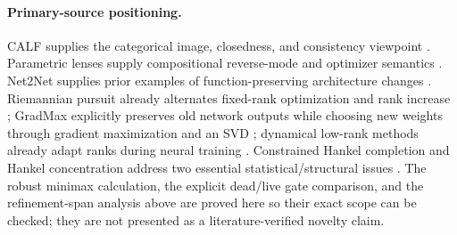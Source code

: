 \documentclass[11pt]{article}
\theoremstyle{definition}
\theoremstyle{remark}
\begin{document}
\paragraph{Primary-source positioning.}
CALF supplies the categorical image, closedness, and consistency viewpoint
\cite{ce:calf2017}. Parametric lenses supply compositional reverse-mode and
optimizer semantics \cite{ce:lenses2024}. Net2Net supplies prior examples
of function-preserving architecture changes \cite{ce:net2net2016}.
Riemannian pursuit already alternates fixed-rank optimization and rank
increase \cite{ce:tan2014}; GradMax explicitly preserves old network
outputs while choosing new weights through gradient maximization and an
SVD \cite{ce:gradmax2022}; dynamical low-rank methods already adapt ranks
during neural training \cite{ce:lottery2022}. Constrained Hankel completion
and Hankel concentration address two essential statistical/structural
issues \cite{ce:balle2012,ce:denis2016}. The robust minimax calculation,
the explicit dead/live gate comparison, and the refinement-span analysis
above are proved here so their exact scope can be checked; they are not
presented as a literature-verified novelty claim.
\end{document}

